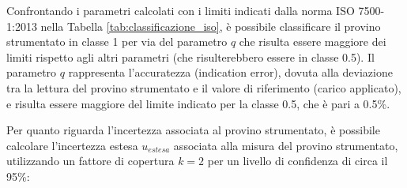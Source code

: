 \documentclass[a4paper, twoside]{article}
\begin{document}
Confrontando i parametri calcolati con i limiti indicati dalla norma ISO 7500-1:2013 nella Tabella \ref{tab:classificazione_iso}, è possibile classificare il provino strumentato in classe 1 per via del parametro $q$ che risulta essere maggiore dei limiti rispetto agli altri parametri (che risulterebbero essere in classe 0.5). Il parametro $q$ rappresenta l'accuratezza (indication error), dovuta alla deviazione tra la lettura del provino strumentato e il valore di riferimento (carico applicato), e risulta essere maggiore del limite indicato per la classe 0.5, che è pari a 0.5\%.

Per quanto riguarda l'incertezza associata al provino strumentato, è possibile calcolare l'incertezza estesa $u_{estesa}$ associata alla misura del provino strumentato, utilizzando un fattore di copertura $k=2$ per un livello di confidenza di circa il 95\%:

\begin{table}[H]
    \centering
    \renewcommand{\arraystretch}{1.3}
    \caption{Componenti di incertezza e incertezza estesa per i vari step di carico}
    \label{tab:incertezze_stbf}
\end{table}
\end{document}
